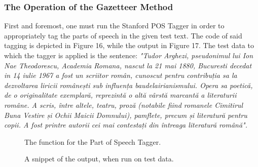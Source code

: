 \documentclass[12pt,a4paper]{article}
\begin{document}
\subsubsection{The Operation of the Gazetteer Method}

\qquad \quad First and foremost, one must run the Stanford POS Tagger in order to appropriately tag the parts of speech in the given test text. The code of said tagging is depicted in Figure 16, while the output in Figure 17. The test data to which the tagger is applied is the sentence: \textit{"Tudor Arghezi, pseudonimul lui Ion Nae Theodorescu, Academia Romana, nascut la 21 mai 1880, Bucuresti decedat in 14 iulie 1967 a fost un scriitor român, cunoscut pentru contribuția sa la dezvoltarea liricii românești sub influența baudelairianismului. Opera sa poetică, de o originalitate exemplară, reprezintă o altă vârstă marcantă a literaturii române. A scris, între altele, teatru, proză (notabile fiind romanele Cimitirul Buna Vestire și Ochii Maicii Domnului), pamflete, precum și literatură pentru copii. A fost printre autorii cei mai contestați din întreaga literatură română".}

 \begin{figure}[h!]
\begin{center}
\end{center}
\caption{The function for the Part of Speech Tagger.}
\end{figure}

\begin{figure}[h!]
\begin{center}
\end{center}
\caption{A snippet of the output, when run on test data.}
\end{figure}
\end{document}
